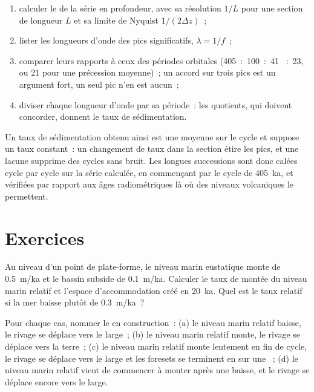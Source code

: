 \begin{method}\label{met:b3:sequence-stratigraphy:cycles}
\begin{enumerate}
\item calculer le  de la série en profondeur, avec sa résolution
  $1/L$ pour une section de longueur $L$ et sa limite de Nyquist $1/(2\Delta z)$~;
\item lister les longueurs d'onde des pics significatifs, $\lambda = 1/f$~;
\item comparer leurs rapports à ceux des périodes orbitales (405~:~100~:~41
  ~:~23, ou 21 pour une précession moyenne)~; un accord sur trois pics est un argument
  fort, un seul pic n'en est aucun~;
\item diviser chaque longueur d'onde par sa période~: les quotients, qui doivent
  concorder, donnent le taux de sédimentation.
\end{enumerate}
\end{method}

Un taux de sédimentation obtenu ainsi est une moyenne sur le cycle et
suppose un taux constant~: un changement de taux dans la section étire les
pics, et une lacune supprime des cycles sans bruit. Les longues successions sont donc
calées cycle par cycle sur la série calculée, en commençant par le cycle de \qty{405}{ka},
et vérifiées par rapport aux âges radiométriques là où des niveaux volcaniques le permettent.

\section{Exercices}

\begin{exercise}[$\star$]\label{exo:b3:sequence-stratigraphy:1}
Au niveau d'un point de plate-forme, le niveau marin eustatique monte de \qty{0.5}{m/ka} et
le bassin subside de \qty{0.1}{m/ka}. Calculer le taux de montée du niveau marin relatif et
l'espace d'accommodation créé en \qty{20}{ka}. Quel est le taux relatif si la mer baisse
plutôt de \qty{0.3}{m/ka}~?
\end{exercise}

\begin{exercise}[$\star$]\label{exo:b3:sequence-stratigraphy:2}
Pour chaque cas, nommer le  en construction~: (a) le niveau marin relatif
baisse, le rivage se déplace vers le large~; (b) le niveau marin relatif monte, le
rivage se déplace vers la terre~; (c) le niveau marin relatif monte lentement en fin de
cycle, le rivage se déplace vers le large et les foresets se terminent en  sur une
~; (d) le niveau marin relatif vient de commencer à monter après
une baisse, et le rivage se déplace encore vers le large.
\end{exercise}

